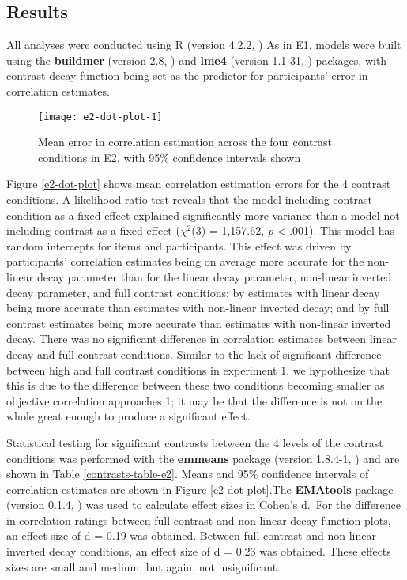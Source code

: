 \documentclass[preprint, 3p,
authoryear]{elsarticle} %
\begin{document}
\hypertarget{results-1}{%
\subsection{Results}\label{results-1}}

All analyses were conducted using R (version 4.2.2, \citealp{r_core}) As
in E1, models were built using the \textbf{buildmer} (version 2.8,
\citealp{voeten_buildmer_2022}) and \textbf{lme4} (version 1.1-31,
\citealp{bates_lme4_2015}) packages, with contrast decay function being
set as the predictor for participants' error in correlation estimates.

\begin{figure}

\texttt{[image: e2-dot-plot-1]} \hfill{}

\caption{\label{e2-dot-plot}Mean error in correlation estimation across the four contrast conditions in E2, with 95\% confidence intervals shown}\label{fig:e2-dot-plot}
\end{figure}

Figure \ref{e2-dot-plot} shows mean correlation estimation errors for
the 4 contrast conditions. A likelihood ratio test reveals that the
model including contrast condition as a fixed effect explained
significantly more variance than a model not including contrast as a
fixed effect (\(\chi^2\)(3) = 1,157.62, \emph{p} \textless{} .001). This
model has random intercepts for items and participants. This effect was
driven by participants' correlation estimates being on average more
accurate for the non-linear decay parameter than for the linear decay
parameter, non-linear inverted decay parameter, and full contrast
conditions; by estimates with linear decay being more accurate than
estimates with non-linear inverted decay; and by full contrast estimates
being more accurate than estimates with non-linear inverted decay. There
was no significant difference in correlation estimates between linear
decay and full contrast conditions. Similar to the lack of significant
difference between high and full contrast conditions in experiment 1, we
hypothesize that this is due to the difference between these two
conditions becoming smaller as objective correlation approaches 1; it
may be that the difference is not on the whole great enough to produce a
significant effect.

Statistical testing for significant contrasts between the 4 levels of
the contrast conditions was performed with the \textbf{emmeans} package
(version 1.8.4-1, \citealp{emmeans}) and are shown in Table
\ref{contrasts-table-e2}. Means and 95\% confidence intervals of
correlation estimates are shown in Figure \ref{e2-dot-plot}.The
\textbf{EMAtools} package (version 0.1.4, \citealp{ematools}) was used
to calculate effect sizes in Cohen's d.~For the difference in
correlation ratings between full contrast and non-linear decay function
plots, an effect size of d = 0.19 was obtained. Between full contrast
and non-linear inverted decay conditions, an effect size of d = 0.23 was
obtained. These effects sizes are small and medium, but again, not
insignificant.
\end{document}
